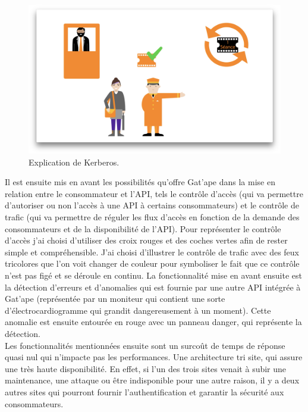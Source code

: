 \begin{figure}[htp]
  \centering
  \includegraphics[width=15cm]{images/gao/screenGao}
  \caption{Explication de Kerberos.}
  \label{screengatape}
\end{figure}

Il est ensuite mis en avant les possibilités qu'offre Gat'ape dans la mise en relation entre le consommateur et l'API, tels le contrôle d'accès (qui va permettre d'autoriser ou non l'accès à une API à certains consommateurs) et le contrôle de trafic (qui va permettre de réguler les flux d'accès en fonction de la demande des consommateurs et de la disponibilité de l'API). Pour représenter le contrôle d'accès j'ai choisi d'utiliser des croix rouges et des coches vertes afin de rester simple et compréhensible. J'ai choisi d'illustrer le contrôle de trafic avec des feux tricolores que l'on voit changer de couleur pour symboliser le fait que ce contrôle n'est pas figé et se déroule en continu. La fonctionnalité mise en avant ensuite est la détection d'erreurs et d'anomalies qui est fournie par une autre API intégrée à Gat'ape (représentée par un moniteur qui contient une sorte d'électrocardiogramme qui grandit dangereusement à un moment). Cette anomalie est ensuite entourée en rouge avec un panneau danger, qui représente la détection.\\

Les fonctionnalités mentionnées ensuite sont un surcoût de temps de réponse quasi nul qui n'impacte pas les performances. Une architecture tri site, qui assure  une très haute disponibilité. En effet, si l'un des trois sites venait à subir une maintenance, une attaque ou être indisponible pour une autre raison, il y a deux autres sites qui pourront fournir l'authentification et garantir la sécurité aux consommateurs.\\

